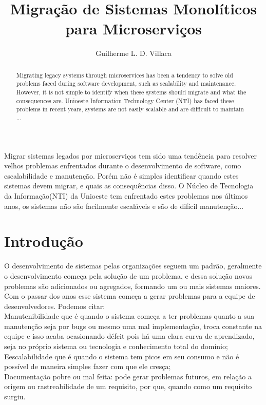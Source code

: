 \documentclass[12pt]{article}
\title{Migração de Sistemas Monolíticos para Microserviços}
\author{Guilherme L. D. Villaca\inst{1}}
\begin{document}
 

\maketitle

\begin{abstract}
Migrating legacy systems through microservices has been a tendency to solve old problems faced during software development, such as scalability and maintenance. However, it is not simple to identify when these systems should migrate and what the consequences are. Unioeste Information Technology Center (NTI) has faced these problems in recent years, systems are not easily scalable and are difficult to maintain ...
\end{abstract}
     
\begin{resumo} 
Migrar sistemas legados por microserviços tem sido uma tendência para resolver velhos problemas enfrentados durante o desenvolvimento de software, como escalabilidade e manutenção. Porém não é simples identificar quando estes sistemas devem migrar, e quais as consequências disso. O Núcleo de Tecnologia da Informação(NTI) da Unioeste tem enfrentado estes problemas nos últimos anos, os sistemas não são facilmente escaláveis e são de difícil manutenção...
\end{resumo}


\section{Introdução}

O desenvolvimento de sistemas pelas organizações seguem um padrão, geralmente o desenvolvimento começa pela solução de um problema, e dessa solução novos problemas são adicionados ou agregados, formando um ou mais sistemas maiores. Com o passar dos anos esse sistema começa a gerar problemas para a equipe de desenvolvedores. Podemos citar: 
\\Manutenibilidade que é quando o sistema começa a ter problemas quanto a sua manutenção seja por bugs ou mesmo uma mal implementação, troca constante na equipe e isso acaba ocasionando défcit pois há uma clara curva de aprendizado, seja no próprio sistema ou tecnologia e conhecimento total do domínio;
\\Eescalabilidade que é quando o sistema tem picos em seu consumo e não é possível de maneira simples fazer com que ele cresça;
\\Documentação pobre ou mal feita: pode gerar problemas futuros, em relação a origem ou rastreabilidade de um requisito, por que, quando como um requisito surgiu.
\\
\end{document}
